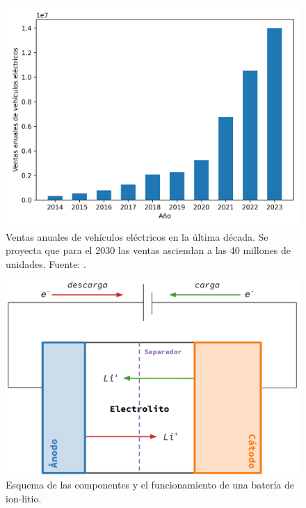 \begin{figure}[h!]
    \centering
    \includegraphics[width=.8\textwidth]{Introduccion/ev-volumes.png}
    \caption{Ventas anuales de vehículos eléctricos en la última década. Se 
    proyecta que para el 2030 las ventas asciendan a las 40 millones de unidades.
    Fuente: \cite{EVV}.}
    \label{fig:ev-volumes}
\end{figure}

\begin{figure}[h!]
    \centering
    \includegraphics[width=.8\textwidth]{Introduccion/esquema_bateria.png}
    \caption{Esquema de las componentes y el funcionamiento de una batería de 
    ion-litio.}
    \label{fig:esquema-bateria}
\end{figure}

